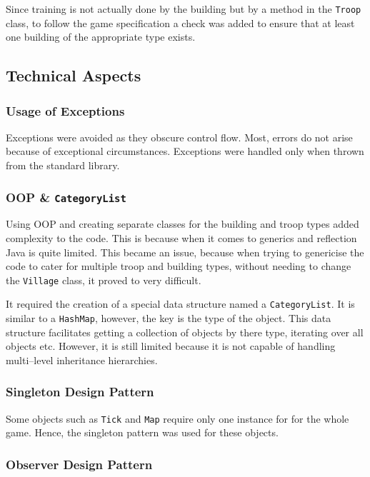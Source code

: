 \documentclass[12pt]{article}
\begin{document}
Since training is not actually done by the building but by a
method in the \texttt{Troop} class, to follow the game
specification a check was added to ensure that at least one
building of the appropriate type exists. 

\subsection{Technical Aspects}

\subsubsection{Usage of Exceptions}

Exceptions were avoided as they obscure control flow. Most,
errors do not arise because of exceptional circumstances.
Exceptions were handled only when thrown from the standard
library.

\subsubsection{OOP \& \texttt{CategoryList}}

Using OOP and creating separate classes for the building and
troop types added complexity to the code. This is because when
it comes to generics and reflection Java is quite limited. This
became an issue, because when trying to genericise the code to
cater for multiple troop and building types, without needing to
change the \texttt{Village} class, it proved to very difficult.

It required the creation of a special data structure named a
\texttt{CategoryList}. It is similar to a \texttt{HashMap},
however, the key is the type of the object. This data structure
facilitates getting a collection of objects by there type,
iterating over all objects etc. However, it is still limited
because it is not capable of handling multi--level inheritance
hierarchies.

\subsubsection{Singleton Design Pattern}

Some objects such as \texttt{Tick} and \texttt{Map} require only
one instance for for the whole game. Hence, the singleton
pattern was used for these objects.

\subsubsection{Observer Design Pattern}
\end{document}
